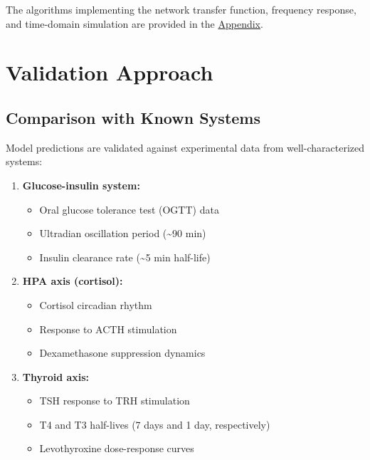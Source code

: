 \documentclass[
]{book}
\providecommand{\tightlist}{%
  \setlength{\itemsep}{0pt}\setlength{\parskip}{0pt}}
\begin{document}
The algorithms implementing the network transfer function, frequency response, and time-domain simulation are provided in the \hyperref[Appendix]{Appendix}.

\section{Validation Approach}\label{validation-approach}

\subsection{Comparison with Known Systems}\label{comparison-with-known-systems}

Model predictions are validated against experimental data from well-characterized systems:

\begin{enumerate}
\def\labelenumi{\arabic{enumi}.}
\tightlist
\item
  \textbf{Glucose-insulin system:}

  \begin{itemize}
  \tightlist
  \item
    Oral glucose tolerance test (OGTT) data
  \item
    Ultradian oscillation period (\textasciitilde90 min)
  \item
    Insulin clearance rate (\textasciitilde5 min half-life)
  \end{itemize}
\item
  \textbf{HPA axis (cortisol):}

  \begin{itemize}
  \tightlist
  \item
    Cortisol circadian rhythm
  \item
    Response to ACTH stimulation
  \item
    Dexamethasone suppression dynamics
  \end{itemize}
\item
  \textbf{Thyroid axis:}

  \begin{itemize}
  \tightlist
  \item
    TSH response to TRH stimulation
  \item
    T4 and T3 half-lives (7 days and 1 day, respectively)
  \item
    Levothyroxine dose-response curves
  \end{itemize}
\end{enumerate}
\end{document}
